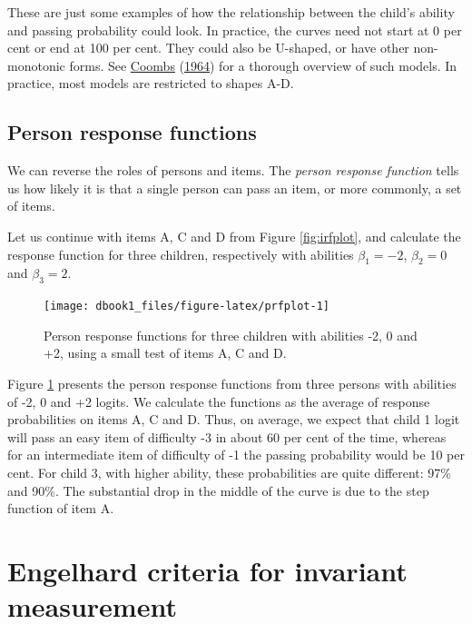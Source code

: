 \documentclass[
]{book}
\begin{document}
These are just some examples of how the relationship between the child's ability and passing probability could look. In practice, the curves need not start at 0 per cent or end at 100 per cent. They could also be U-shaped, or have other non-monotonic forms. See \protect\hyperlink{ref-coombs1964}{Coombs} (\protect\hyperlink{ref-coombs1964}{1964}) for a thorough overview of such models. In practice, most models are restricted to shapes A-D.

\hypertarget{person-response-functions}{%
\subsection{Person response functions}\label{person-response-functions}}

We can reverse the roles of persons and items. The \emph{person response function} tells us how likely it is that a single person can pass an item, or more commonly, a set of items.

Let us continue with items A, C and D from Figure \ref{fig:irfplot}, and calculate the response function for three children, respectively with abilities \(\beta_1 = -2\), \(\beta_2 = 0\) and \(\beta_3 = 2\).

\begin{figure}

{\centering \texttt{[image: dbook1\_files/figure-latex/prfplot-1]} 

}

\caption{Person response functions for three children with abilities -2, 0 and +2, using a small test of items A, C and D.}\label{fig:prfplot}
\end{figure}



Figure \ref{fig:prfplot} presents the person response functions from three persons with abilities of -2, 0 and +2 logits. We calculate the functions as the average of response probabilities on items A, C and D. Thus, on average, we expect that child 1 logit will pass an easy item of difficulty -3 in about 60 per cent of the time, whereas for an intermediate item of difficulty of -1 the passing probability would be 10 per cent. For child 3, with higher ability, these probabilities are quite different: 97\% and 90\%. The substantial drop in the middle of the curve is due to the step function of item A.

\hypertarget{sec:engelhard}{%
\section{Engelhard criteria for invariant measurement}\label{sec:engelhard}}
\end{document}
